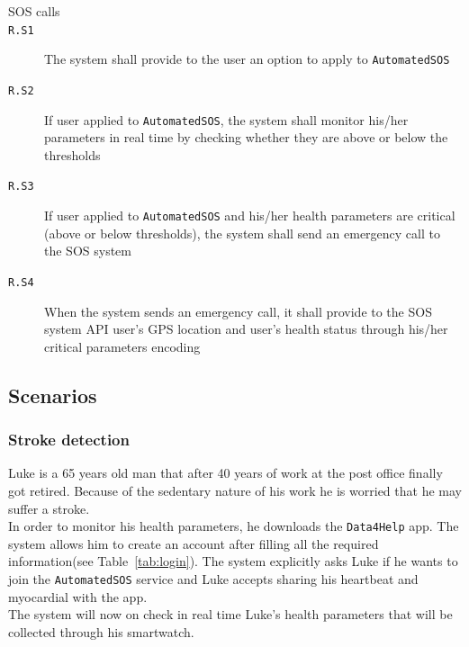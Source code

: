 \begin{description}
      \item[SOS calls]
      \item[\texttt{R.S1}] The system shall provide to the user an option to apply to \texttt{AutomatedSOS}
      \item[\texttt{R.S2}] If user applied to \texttt{AutomatedSOS}, the system shall monitor his/her parameters in real time by checking whether they are above or below the thresholds
      \item[\texttt{R.S3}] If user applied to \texttt{AutomatedSOS} and his/her health parameters are critical (above or below thresholds), the system shall send an emergency call to the SOS system
      \item[\texttt{R.S4}] When the system sends an emergency call, it shall provide to the SOS system API user's GPS location and user's health status through his/her critical parameters encoding

    \end{description}

  \subsection{Scenarios}

\subsubsection{Stroke detection} %
    \label{sec:}

      Luke is a 65 years old man that after 40 years of work at the post office finally got retired. Because of the sedentary nature of his work he is worried that he may suffer a stroke.\\
      In order to monitor his health parameters, %
      he downloads the \texttt{Data4Help} app. The system allows him to create an account after filling all the required information(see Table~\ref{tab:login}). The system explicitly asks Luke if he wants to join the \texttt{AutomatedSOS} service and Luke accepts sharing his heartbeat and myocardial with the app. \\The system will now on check in real time Luke's health parameters that will be collected through his smartwatch. %


